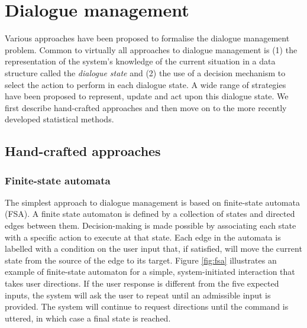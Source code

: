 \section{Dialogue management}
\label{sec:dm}

Various approaches have been proposed to formalise the dialogue management problem.  Common to virtually all approaches to dialogue management is (1) the representation of the system's knowledge of the current situation in a data structure called the \textit{dialogue state} and (2) the use of a decision mechanism to select the action to perform in each dialogue state. A wide range of strategies have been proposed to represent, update and act upon this dialogue state.  We first describe hand-crafted approaches and then move on to the more recently developed statistical methods. 

\subsection{Hand-crafted approaches}
\label{sec:hand-crafted}

\subsubsection*{Finite-state automata}

The simplest approach to dialogue management is based on finite-state automata (FSA).  A finite state automaton is defined by a collection of states and directed edges between them.  Decision-making is made possible by associating each state with a specific action to execute at that state. Each edge in the automata is labelled with a condition on the user input that, if satisfied, will move the current state from the source of the edge to its target.  Figure \ref{fig:fsa} illustrates an example of finite-state automaton for a simple, system-initiated interaction that takes user directions.  If the user response is different from the five expected inputs, the system will ask the user to repeat until an admissible input is provided.  The system will continue to request directions until the  command is uttered, in which case a final state is reached. 


